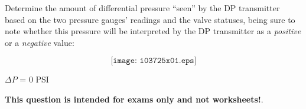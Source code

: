 

Determine the amount of differential pressure ``seen'' by the DP transmitter based on the two pressure gauges' readings and the valve statuses, being sure to note whether this pressure will be interpreted by the DP transmitter as a {\it positive} or a {\it negative} value:

$$\texttt{[image: i03725x01.eps]}$$







$\Delta P$ = 0 PSI







{\bf This question is intended for exams only and not worksheets!}.



